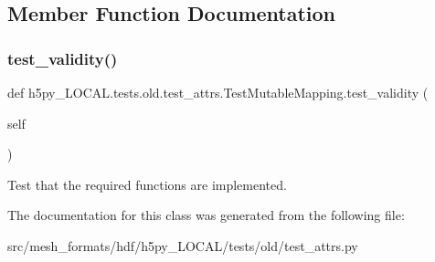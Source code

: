 \subsection{Member Function Documentation}
\mbox{\label{classh5py__LOCAL_1_1tests_1_1old_1_1test__attrs_1_1TestMutableMapping_a193c8825ac8307a8c16c90baf561d6a3}} 
\subsubsection{\texorpdfstring{test\+\_\+validity()}{test\_validity()}}
{\footnotesize\ttfamily def h5py\+\_\+\+L\+O\+C\+A\+L.\+tests.\+old.\+test\+\_\+attrs.\+Test\+Mutable\+Mapping.\+test\+\_\+validity (\begin{DoxyParamCaption}\item[{}]{self }\end{DoxyParamCaption})}

\begin{DoxyVerb}Test that the required functions are implemented.
\end{DoxyVerb}
 

The documentation for this class was generated from the following file\+:\begin{DoxyCompactItemize}
\item 
src/mesh\+\_\+formats/hdf/h5py\+\_\+\+L\+O\+C\+A\+L/tests/old/test\+\_\+attrs.\+py\end{DoxyCompactItemize}
